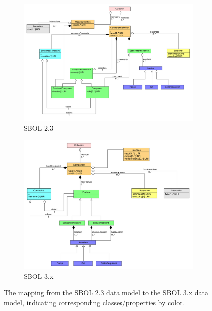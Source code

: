 \begin{figure}[h]
	\begin{subfigure}{.5\textwidth}
		\centering
		\includegraphics[width=\linewidth]{images/sbol_v2_to_v3_left_subfigure}  
		\caption{SBOL 2.3}
		\label{fig:sub-first}
	\end{subfigure}\begin{subfigure}{.5\textwidth}
		\centering
		\includegraphics[width=\linewidth]{images/sbol_v2_to_v3_right_subfigure}  
		\caption{SBOL 3.x}
		\label{fig:sub-second}
	\end{subfigure}
	\caption{\label{SBOL2TO3}The mapping from the SBOL 2.3 data model to the SBOL 3.x  data model, indicating corresponding classes/properties by color.}
\end{figure}